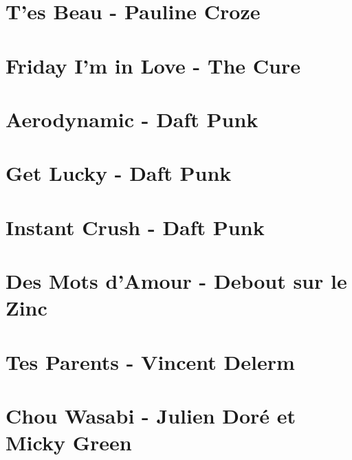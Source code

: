 \documentclass[11pt]{article}
\begin{document}
\section{T'es Beau - Pauline Croze}
\begin{guitar}

\end{guitar}


\section{Friday I'm in Love - The Cure}
\begin{guitar}

\end{guitar}


\section{Aerodynamic - Daft Punk}


\section{Get Lucky - Daft Punk}




\section{Instant Crush - Daft Punk}
\begin{guitar}

\end{guitar}

\section{Des Mots d'Amour - Debout sur le Zinc}


\section{Tes Parents - Vincent Delerm}


\section{Chou Wasabi - Julien Doré et Micky Green}
\begin{guitar}

\end{guitar}
\end{document}
